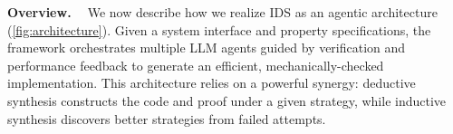 \textbf{Overview. \ }
%
We now describe how we realize IDS as an agentic architecture (\cref{fig:architecture}). Given a system interface and property specifications, the framework orchestrates multiple LLM agents guided by verification and performance feedback to generate an efficient, mechanically-checked implementation. This architecture relies on a powerful synergy: deductive synthesis constructs the code and proof under a given strategy, while inductive synthesis discovers better strategies from failed attempts.
% 


